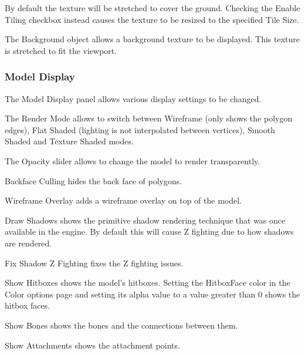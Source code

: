 \documentclass[10pt, a4paper, titlepage, oneside]{article}
\begin{document}
\vspace{\baselineskip}
By default the texture will be stretched to cover the ground. Checking the Enable Tiling checkbox instead causes the texture to be resized to the specified Tile Size.

\vspace{\baselineskip}
The Background object allows a background texture to be displayed. This texture is stretched to fit the viewport.

\newpage

\subsubsection{Model Display}

The Model Display panel allows various display settings to be changed.

\vspace{\baselineskip}
The Render Mode allows to switch between Wireframe (only shows the polygon edges), Flat Shaded (lighting is not interpolated between vertices), Smooth Shaded and Texture Shaded modes.

\vspace{\baselineskip}
The Opacity slider allows to change the model to render transparently.

\vspace{\baselineskip}
Backface Culling hides the back face of polygons.

\vspace{\baselineskip}
Wireframe Overlay adds a wireframe overlay on top of the model.

\vspace{\baselineskip}
Draw Shadows shows the primitive shadow rendering technique that was once available in the engine. By default this will cause Z fighting due to how shadows are rendered.

\vspace{\baselineskip}
Fix Shadow Z Fighting fixes the Z fighting issues.

\vspace{\baselineskip}
Show Hitboxes shows the model's hitboxes. Setting the HitboxFace color in the Color options page and setting its alpha value to a value greater than 0 shows the hitbox faces.

\vspace{\baselineskip}
Show Bones shows the bones and the connections between them.

\vspace{\baselineskip}
Show Attachments shows the attachment points.
\end{document}

